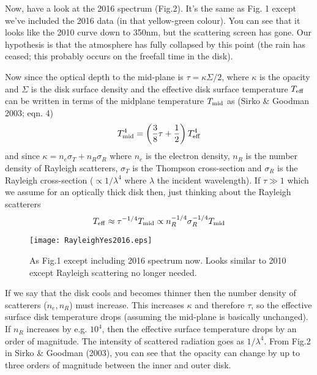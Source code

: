 \documentclass[12pt]{article}
\begin{document}
Now, have a look at the 2016 spectrum (Fig.2). It's the same as Fig. 1 except we've included the 2016 data (in that yellow-green colour). You can see that it looks like the 2010 curve down to 350nm, but the scattering screen has gone. Our hypothesis is that the atmosphere has fully collapsed by this point (the rain has ceased; this probably occurs on the freefall time in the disk).

Now since the optical depth to the mid-plane is $\tau=\kappa \Sigma/2$, where $\kappa$ is the opacity and $\Sigma$ is the disk surface density and the effective disk surface temperature $T_{\rm eff}$ can be written in terms of the midplane temperature $T_{\rm mid}$ as (Sirko \& Goodman 2003; eqn. 4)
\begin{equation}
T^{4}_{\rm mid}= \left(\frac{3}{8} \tau +\frac{1}{2} \right)T_{\rm eff}^{4}
\end{equation}
and since $\kappa=n_{e}\sigma_{T} + n_{R} \sigma_{R}$ where $n_{e}$ is the electron density, $n_{R}$ is the number density of Rayleigh scatterers, $\sigma_{T}$ is the Thompson cross-section and $\sigma_{R}$ is the Rayleigh cross-section ($\propto 1/\lambda^{4}$ where $\lambda$ the incident wavelength). If $\tau \gg 1$ which we assume for an optically thick disk then, just thinking about the Rayleigh scatterers
\begin{equation}
T_{\rm eff} \approx \tau^{-1/4} T_{\rm mid} \propto n_{R}^{-1/4} \sigma_{R}^{-1/4} T_{\rm mid}
\end{equation}


\begin{figure}
\begin{center}
\texttt{[image: RayleighYes2016.eps]}
\end{center}
\caption[cartoon]{
As Fig.1 except including 2016 spectrum now. Looks similar to 2010 except Rayleigh scattering no longer needed.  
\label{fig:rayleigh2}}
\end{figure}


If we say that the disk cools and becomes thinner then the number density of scatterers ($n_{e},n_{R}$) must increase. This increases $\kappa$ and therefore $\tau$, so the effective surface disk temperature drops (assuming the mid-plane is basically unchanged). If $n_{R}$ increases by e.g. $10^{4}$, then the effective surface temperature drops by an order of magnitude. The intensity of scattered radiation goes as $1/\lambda^{4}$. From Fig.2 in Sirko \& Goodman (2003), you can see that the opacity can change by up to three orders of magnitude between the inner and outer disk.
\end{document}
